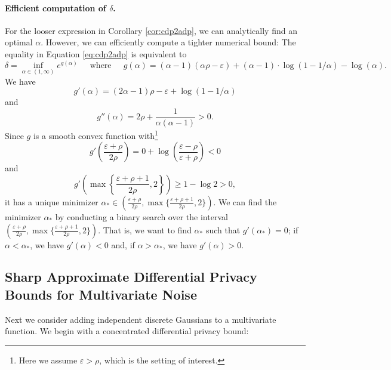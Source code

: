 \documentclass{jpcfinal} %
\newcommand{\eps}{\varepsilon}
\begin{document}
\paragraph{Efficient computation of $\delta$.} For the looser expression in Corollary \ref{cor:cdp2adp}, we can analytically find an optimal $\alpha$. However, we can efficiently compute a tighter numerical bound: The equality in Equation \ref{eq:cdp2adp} is equivalent to
\begin{equation}
    \delta = \inf_{\alpha\in(1,\infty)} e^{g(\alpha)} ~~~~~\text{ where }~~~~~ g(\alpha) = (\alpha-1)(\alpha\rho-\eps) + (\alpha-1) \cdot \log(1-1/\alpha) - \log(\alpha).
\end{equation}
We have 
\begin{equation}
    g'(\alpha)
= (2\alpha-1)\rho - \eps + \log(1-1/\alpha) 
\end{equation} and
\begin{equation}
g''(\alpha) 
= 2\rho + \frac{1}{\alpha(\alpha-1)} > 0.
\end{equation}
Since $g$ is a smooth convex function with\footnote{Here we assume $\eps>\rho$, which is the setting of interest.} \begin{equation}
    g'\left(\frac{\eps+\rho}{2\rho}\right) = 0+\log\left(\frac{\eps-\rho}{\eps+\rho}\right)<0
\end{equation}
and
\begin{equation}
    g'\left(\max\left\{\frac{\eps+\rho+1}{2\rho},2\right\}\right) \ge 1 - \log 2>0,
\end{equation} it has a unique minimizer $\alpha_* \in \left(\frac{\eps+\rho}{2\rho},\max\{\frac{\eps+\rho+1}{2\rho},2\}\right)$. We can find the minimizer $\alpha_*$ by conducting a binary search over the interval $ \left(\frac{\eps+\rho}{2\rho},\max\{\frac{\eps+\rho+1}{2\rho},2\}\right)$. That is, we want to find $\alpha_*$ such that $g'(\alpha_*)=0$; if $\alpha<\alpha_*$, we have $g'(\alpha)<0$ and, if $\alpha>\alpha_*$, we have $g'(\alpha)>0$.


\subsection{Sharp Approximate Differential Privacy Bounds for Multivariate Noise}

Next we consider adding independent discrete Gaussians to a multivariate function. We begin with a concentrated differential privacy bound:
\end{document}
